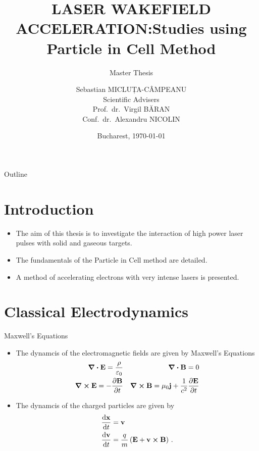 \documentclass{beamer}
\title{LASER WAKEFIELD ACCELERATION:\@ Studies using Particle in Cell Method}
\subtitle{Master Thesis}
\date{Bucharest, \today}
\author{Sebastian MICLUȚA-CÂMPEANU\\
Scientific Advisers\\
Prof.~dr.~Virgil BĂRAN \\
Conf.~dr.~Alexandru NICOLIN}
\institute{University of Bucharest}
\begin{document}
\maketitle%


\begin{frame}{Outline}
  \tableofcontents[]
\end{frame}

\section{Introduction}


\begin{frame}
  \begin{itemize}
	\item The aim of this thesis is to investigate the interaction of high power
	laser pulses with solid and gaseous targets.
    \item The fundamentals of the Particle in Cell method are detailed.
	\item A method of accelerating electrons with very intense lasers is presented.
  \end{itemize}
\end{frame}

\section{Classical Electrodynamics}

\begin{frame}{Maxwell's Equations}
	\begin{itemize}
		\item The dynamcis of the electromagnetic fields are given by Maxwell's Equations
		\begin{subequations}%
		  \begin{align*}
		    \div{\vb{E}}  = \frac{\rho}{\varepsilon_0} &&
		    \div{\vb{B}}  = 0  \\
		    \curl{\vb{E}}  = - \pdv{\vb{B}}{t} &&
		    \curl{\vb{B}}  = \mu_0 \vb{j} + \frac{1}{c^2} \pdv{\vb{E}}{t}
		  \end{align*}
		\end{subequations}
		\item The dynamcis of the charged particles are given by
		\begin{align*}
		  \dv{\vb{x}}{t} &= \vb{v} \\
		  \dv{\vb{v}}{t} &= \frac{q}{m} \left(\vb{E} + \vb{v}\cp\vb{B}\right)\,.
		\end{align*}
	\end{itemize}
\end{frame}
\end{document}
